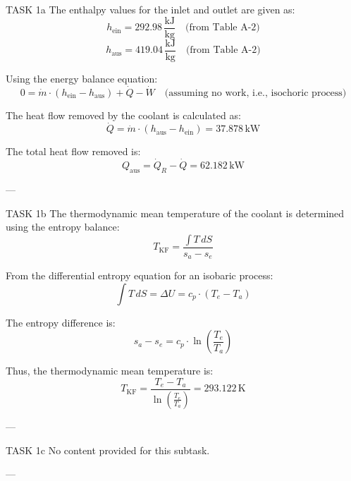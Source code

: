 TASK 1a  
The enthalpy values for the inlet and outlet are given as:  
\[
h_{\text{ein}} = 292.98 \, \frac{\text{kJ}}{\text{kg}} \quad \text{(from Table A-2)}
\]  
\[
h_{\text{aus}} = 419.04 \, \frac{\text{kJ}}{\text{kg}} \quad \text{(from Table A-2)}
\]  

Using the energy balance equation:  
\[
0 = \dot{m} \cdot (h_{\text{ein}} - h_{\text{aus}}) + \dot{Q} - \dot{W} \quad \text{(assuming no work, i.e., isochoric process)}
\]  

The heat flow removed by the coolant is calculated as:  
\[
\dot{Q} = \dot{m} \cdot (h_{\text{aus}} - h_{\text{ein}}) = 37.878 \, \text{kW}
\]  

The total heat flow removed is:  
\[
Q_{\text{aus}} = \dot{Q}_R - \dot{Q} = 62.182 \, \text{kW}
\]  

---

TASK 1b  
The thermodynamic mean temperature of the coolant is determined using the entropy balance:  
\[
T_{\text{KF}} = \frac{\int T \, dS}{s_a - s_e}
\]  

From the differential entropy equation for an isobaric process:  
\[
\int T \, dS = \Delta U = c_p \cdot (T_e - T_a)
\]  

The entropy difference is:  
\[
s_a - s_e = c_p \cdot \ln\left(\frac{T_e}{T_a}\right)
\]  

Thus, the thermodynamic mean temperature is:  
\[
T_{\text{KF}} = \frac{T_e - T_a}{\ln\left(\frac{T_e}{T_a}\right)} = 293.122 \, \text{K}
\]  

---

TASK 1c  
No content provided for this subtask.  

---